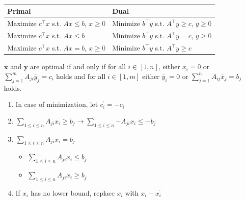 \begin{tabular}{|l|l|}
\hline
\textbf{Primal} & \textbf{Dual} \\
\hline
Maximize $c^\intercal x$ s.t. $Ax \leq b$, $x \geq 0$ & Minimize $b^\intercal y$ s.t. $A^\intercal y \geq c$, $y \geq 0$ \\
\hline
Maximize $c^\intercal x$ s.t. $Ax \leq b$ & Minimize $b^\intercal y$ s.t. $A^\intercal y = c$, $y \geq 0$ \\
\hline
Maximize $c^\intercal x$ s.t. $Ax = b$, $x \geq 0$ & Minimize $b^\intercal y$ s.t. $A^\intercal y \geq c$ \\
\hline
\end{tabular}

$\bar{\mathbf{x}}$ and $\bar{\mathbf{y}}$ are optimal if and only if for all $i \in [1, n]$, either $\bar{x}_i = 0$ or $\sum_{j=1}^{m}A_{ji}\bar{y}_j = c_i$ holds and for all $i \in [1, m]$ either $\bar{y}_i = 0$ or $\sum_{j=1}^{n}A_{ij}\bar{x}_j = b_j$ holds.

\begin{enumerate}
    \item In case of minimization, let $c^\prime_i = -c_i$
    \item $\sum_{1 \leq i \leq n}{A_{ji}x_i} \geq b_j \rightarrow \sum_{1 \leq i \leq n}{-A_{ji}x_i} \leq -b_j$
    \item $\sum_{1 \leq i \leq n}{A_{ji}x_i} = b_j$
        \begin{itemize}
            \item $\sum_{1 \leq i \leq n}{A_{ji}x_i} \leq b_j$
            \item $\sum_{1 \leq i \leq n}{A_{ji}x_i} \geq b_j$
        \end{itemize}
    \item If $x_i$ has no lower bound, replace $x_i$ with $x_i - x_i^\prime$
\end{enumerate}

